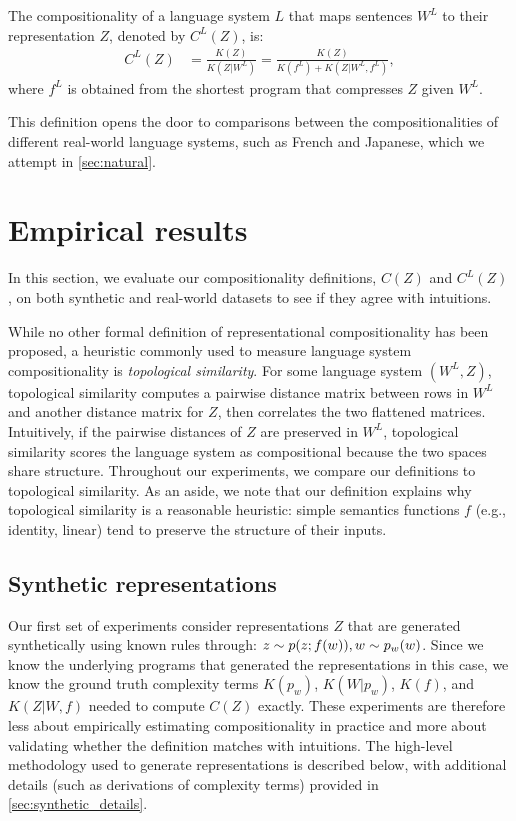 \documentclass{article} %
\begin{document}
\begin{definition}
    \label{def:language_compositionality}
    The compositionality of a language system $L$ that maps sentences $W^L$ to their representation $Z$, denoted by $C^L(Z)$, is:
    \begin{align}
    \label{eq:C^L(Z)}
    C^L(Z) &= \frac{K(Z)}{K(Z|W^L)} = \frac{K(Z)}{K(f^L) + K(Z|W^L,f^L)} ,
    \end{align}
    where $f^L$ is obtained from the shortest program that compresses $Z$ given $W^L$.
\end{definition}

This definition opens the door to comparisons between the compositionalities of different real-world language systems, such as French and Japanese, which we attempt in \cref{sec:natural}.


\section{Empirical results}
\label{sec:experiments}

In this section, we evaluate our compositionality definitions, $C(Z)$ and $C^L(Z)$, on both synthetic and real-world datasets to see if they agree with intuitions.

While no other formal definition of representational compositionality has been proposed, a heuristic commonly used to measure language system compositionality is \textit{topological similarity}. For some language system $(W^L, Z)$, topological similarity computes a pairwise distance matrix between rows in $W^L$ and another distance matrix for $Z$, then correlates the two flattened matrices. Intuitively, if the pairwise distances of $Z$ are preserved in $W^L$, topological similarity scores the language system as compositional because the two spaces share structure. Throughout our experiments, we compare our definitions to topological similarity. As an aside, we note that our definition explains why topological similarity is a reasonable heuristic: simple semantics functions $f$ (e.g., identity, linear) tend to preserve the structure of their inputs.

\subsection{Synthetic representations}
\label{sec:synthetic}

Our first set of experiments consider representations $Z$ that are generated synthetically using known rules through: $z \sim p(z ; f(w)),\space w \sim p_w(w)$. Since we know the underlying programs that generated the representations in this case, we know the ground truth complexity terms $K(p_w)$, $K(W | p_w)$, $K(f)$, and $K(Z | W, f)$ needed to compute $C(Z)$ exactly. These experiments are therefore less about empirically estimating compositionality in practice and more about validating whether the definition matches with intuitions. The high-level methodology used to generate representations is described below, with additional details (such as derivations of complexity terms) provided in \cref{sec:synthetic_details}.
\end{document}
